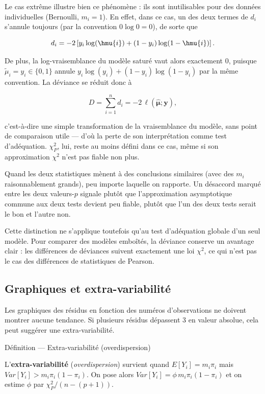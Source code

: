 \documentclass[
  french,
  letterpaper,
  DIV=11,
  numbers=noendperiod]{scrreprt}
\begin{document}
Le cas extrême illustre bien ce phénomène : ils sont inutilisables pour
des données individuelles (Bernoulli, \(m_i=1\)). En effet, dans ce cas,
un des deux termes de \(d_i\) s'annule toujours (par la convention
\(0\log 0=0\)), de sorte que

\[
d_i = -2\left[y_i\log(\hmu{i}) + (1-y_i)\log(1-\hmu{i})\right].
\]

De plus, la log-vraisemblance du modèle saturé vaut alors exactement 0,
puisque \(\tilde\mu_i = y_i \in \{0,1\}\) annule
\(y_i\log(y_i)+(1-y_i)\log(1-y_i)\) par la même convention. La déviance
se réduit donc à

\[
D = \sum_{i=1}^n d_i = -2\,\ell(\hat{\boldsymbol\mu};\boldsymbol y),
\]

c'est-à-dire une simple transformation de la vraisemblance du modèle,
sans point de comparaison utile --- d'où la perte de son interprétation
comme test d'adéquation. \(\chi^2_P\), lui, reste au moins défini dans
ce cas, même si son approximation \(\chi^2\) n'est pas fiable non plus.

Quand les deux statistiques mènent à des conclusions similaires (avec
des \(m_i\) raisonnablement grands), peu importe laquelle on rapporte.
Un désaccord marqué entre les deux valeurs-\(p\) signale plutôt que
l'approximation asymptotique commune aux deux tests devient peu fiable,
plutôt que l'un des deux tests serait le bon et l'autre non.

Cette distinction ne s'applique toutefois qu'au test d'adéquation
globale d'un seul modèle. Pour comparer des modèles emboîtés, la
déviance conserve un avantage clair : les différences de déviances
suivent exactement une loi \(\chi^2\), ce qui n'est pas le cas des
différences de statistiques de Pearson.

\subsection{Graphiques et
extra-variabilité}\label{graphiques-et-extra-variabilituxe9}

Les graphiques des résidus en fonction des numéros d'observations ne
doivent montrer aucune tendance. Si plusieurs résidus dépassent 3 en
valeur absolue, cela peut suggérer une extra-variabilité.

{Définition --- Extra-variabilité (overdispersion)}

L'\textbf{extra-variabilité} (\emph{overdispersion}) survient quand
\(E[Y_i] = m_i\pi_i\) mais \(Var[Y_i] > m_i\pi_i(1-\pi_i)\). On pose
alors \(Var[Y_i] = \phi\, m_i\pi_i(1-\pi_i)\) et on estime \(\phi\) par
\(\chi^2_P/(n-(p+1))\).
\end{document}
